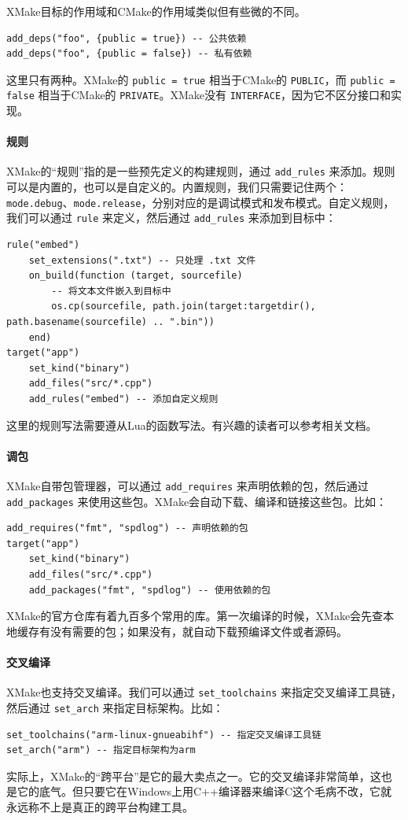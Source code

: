 XMake目标的作用域和CMake的作用域类似但有些微的不同。
\begin{verbatim}
add_deps("foo", {public = true}) -- 公共依赖
add_deps("foo", {public = false}) -- 私有依赖
\end{verbatim}
这里只有两种。XMake的 \verb|public = true| 相当于CMake的 \verb|PUBLIC|，而 \verb|public = false| 相当于CMake的 \verb|PRIVATE|。XMake没有 \verb|INTERFACE|，因为它不区分接口和实现。

\paragraph{规则} XMake的“规则”指的是一些预先定义的构建规则，通过 \verb|add_rules| 来添加。规则可以是内置的，也可以是自定义的。内置规则，我们只需要记住两个：\verb|mode.debug|、\verb|mode.release|，分别对应的是调试模式和发布模式。自定义规则，我们可以通过 \verb|rule| 来定义，然后通过 \verb|add_rules| 来添加到目标中：
\begin{verbatim}
rule("embed")
    set_extensions(".txt") -- 只处理 .txt 文件
    on_build(function (target, sourcefile)
        -- 将文本文件嵌入到目标中
        os.cp(sourcefile, path.join(target:targetdir(), path.basename(sourcefile) .. ".bin"))
    end)
target("app")
    set_kind("binary")
    add_files("src/*.cpp")
    add_rules("embed") -- 添加自定义规则
\end{verbatim}
这里的规则写法需要遵从Lua的函数写法。有兴趣的读者可以参考相关文档。

\paragraph{调包} XMake自带包管理器，可以通过 \verb|add_requires| 来声明依赖的包，然后通过 \verb|add_packages| 来使用这些包。XMake会自动下载、编译和链接这些包。比如：
\begin{verbatim}
add_requires("fmt", "spdlog") -- 声明依赖的包
target("app")
    set_kind("binary")
    add_files("src/*.cpp")
    add_packages("fmt", "spdlog") -- 使用依赖的包
\end{verbatim}
XMake的官方仓库有着九百多个常用的库。第一次编译的时候，XMake会先查本地缓存有没有需要的包；如果没有，就自动下载预编译文件或者源码。

\paragraph{交叉编译} XMake也支持交叉编译。我们可以通过 \verb|set_toolchains| 来指定交叉编译工具链，然后通过 \verb|set_arch| 来指定目标架构。比如：
\begin{verbatim}
set_toolchains("arm-linux-gnueabihf") -- 指定交叉编译工具链
set_arch("arm") -- 指定目标架构为arm
\end{verbatim}
实际上，XMake的“跨平台”是它的最大卖点之一。它的交叉编译非常简单，这也是它的底气。但只要它在Windows上用C++编译器来编译C这个毛病不改，它就永远称不上是真正的跨平台构建工具。

